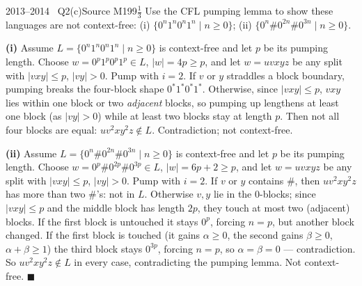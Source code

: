 \documentclass[11pt,a4paper]{article}
\begin{document}
\begin{question}{2013--2014 \textbullet\ Q2(c)}{Source M19}{9$\tfrac13$}
Use the CFL pumping lemma to show these languages are not context-free: (i) $\{0^n1^n0^n1^n\mid n\ge0\}$; (ii) $\{0^n\#0^{2n}\#0^{3n}\mid n\ge0\}$.
\end{question}
\begin{solution}
\textbf{(i)} Assume $L=\{0^n1^n0^n1^n\mid n\ge0\}$ is context-free and let $p$ be its pumping length. Choose $w=0^p1^p0^p1^p\in L$, $|w|=4p\ge p$, and let $w=uvxyz$ be any split with $|vxy|\le p$, $|vy|>0$. Pump with $i=2$. If $v$ or $y$ straddles a block boundary, pumping breaks the four-block shape $0^*1^*0^*1^*$. Otherwise, since $|vxy|\le p$, $vxy$ lies within one block or two \emph{adjacent} blocks, so pumping up lengthens at least one block (as $|vy|>0$) while at least two blocks stay at length $p$. Then not all four blocks are equal: $uv^2xy^2z\notin L$. Contradiction; not context-free.

\textbf{(ii)} Assume $L=\{0^n\#0^{2n}\#0^{3n}\mid n\ge0\}$ is context-free and let $p$ be its pumping length. Choose $w=0^p\#0^{2p}\#0^{3p}\in L$, $|w|=6p+2\ge p$, and let $w=uvxyz$ be any split with $|vxy|\le p$, $|vy|>0$. Pump with $i=2$. If $v$ or $y$ contains $\#$, then $uv^2xy^2z$ has more than two $\#$'s: not in $L$. Otherwise $v,y$ lie in the 0-blocks; since $|vxy|\le p$ and the middle block has length $2p$, they touch at most two (adjacent) blocks. If the first block is untouched it stays $0^p$, forcing $n=p$, but another block changed. If the first block is touched (it gains $\alpha\ge0$, the second gains $\beta\ge0$, $\alpha+\beta\ge1$) the third block stays $0^{3p}$, forcing $n=p$, so $\alpha=\beta=0$ --- contradiction. So $uv^2xy^2z\notin L$ in every case, contradicting the pumping lemma. Not context-free. \hfill$\blacksquare$
\end{solution}
\end{document}
